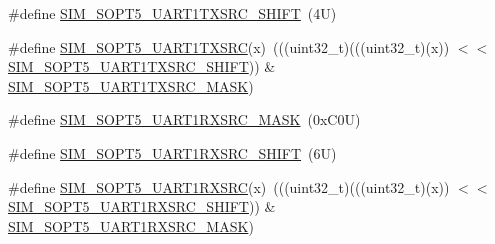 \begin{DoxyCompactItemize}
\item 
\#define \mbox{\hyperlink{group___s_i_m___register___masks_ga7714c11e5536dacc90fbc2960e532e94}{S\+I\+M\+\_\+\+S\+O\+P\+T5\+\_\+\+U\+A\+R\+T1\+T\+X\+S\+R\+C\+\_\+\+S\+H\+I\+FT}}~(4\+U)
\item 
\#define \mbox{\hyperlink{group___s_i_m___register___masks_ga78611068b87a39563cd065ff840e3c68}{S\+I\+M\+\_\+\+S\+O\+P\+T5\+\_\+\+U\+A\+R\+T1\+T\+X\+S\+RC}}(x)~(((uint32\+\_\+t)(((uint32\+\_\+t)(x)) $<$$<$ \mbox{\hyperlink{group___s_i_m___register___masks_ga7714c11e5536dacc90fbc2960e532e94}{S\+I\+M\+\_\+\+S\+O\+P\+T5\+\_\+\+U\+A\+R\+T1\+T\+X\+S\+R\+C\+\_\+\+S\+H\+I\+FT}})) \& \mbox{\hyperlink{group___s_i_m___register___masks_gac473b632c382f785d524c177ff186e0d}{S\+I\+M\+\_\+\+S\+O\+P\+T5\+\_\+\+U\+A\+R\+T1\+T\+X\+S\+R\+C\+\_\+\+M\+A\+SK}})
\item 
\#define \mbox{\hyperlink{group___s_i_m___register___masks_gaf34eb14baf5894693130af7addd8aa6f}{S\+I\+M\+\_\+\+S\+O\+P\+T5\+\_\+\+U\+A\+R\+T1\+R\+X\+S\+R\+C\+\_\+\+M\+A\+SK}}~(0x\+C0\+U)
\item 
\#define \mbox{\hyperlink{group___s_i_m___register___masks_ga098fcb3123342f9cd96869c69d2fb7a9}{S\+I\+M\+\_\+\+S\+O\+P\+T5\+\_\+\+U\+A\+R\+T1\+R\+X\+S\+R\+C\+\_\+\+S\+H\+I\+FT}}~(6\+U)
\item 
\#define \mbox{\hyperlink{group___s_i_m___register___masks_ga51d909264c2944ea7fb47356aa705536}{S\+I\+M\+\_\+\+S\+O\+P\+T5\+\_\+\+U\+A\+R\+T1\+R\+X\+S\+RC}}(x)~(((uint32\+\_\+t)(((uint32\+\_\+t)(x)) $<$$<$ \mbox{\hyperlink{group___s_i_m___register___masks_ga098fcb3123342f9cd96869c69d2fb7a9}{S\+I\+M\+\_\+\+S\+O\+P\+T5\+\_\+\+U\+A\+R\+T1\+R\+X\+S\+R\+C\+\_\+\+S\+H\+I\+FT}})) \& \mbox{\hyperlink{group___s_i_m___register___masks_gaf34eb14baf5894693130af7addd8aa6f}{S\+I\+M\+\_\+\+S\+O\+P\+T5\+\_\+\+U\+A\+R\+T1\+R\+X\+S\+R\+C\+\_\+\+M\+A\+SK}})
\end{DoxyCompactItemize}
